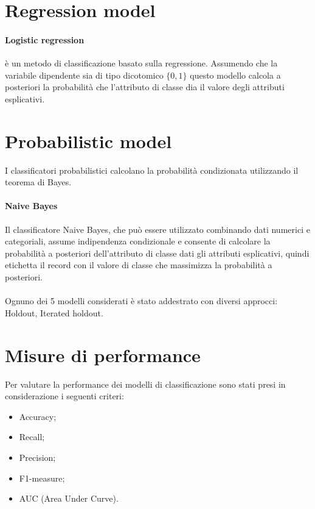\documentclass[12pt,a4paper]{report}
\begin{document}
\begin{multicols}{2}
	\section{Regression model} 
	
	\paragraph{Logistic regression} è un metodo di classificazione basato sulla regressione. Assumendo che la variabile dipendente sia di tipo dicotomico $\{0,1\}$ questo modello calcola a posteriori la probabilità  che l'attributo di classe dia il valore degli attributi esplicativi.
	
	\section{Probabilistic model} 
	
	I classificatori probabilistici calcolano la probabilità condizionata utilizzando il teorema di Bayes. 
	
	\paragraph{Naive Bayes} Il classificatore Naive Bayes, che può essere utilizzato combinando dati numerici e categoriali, assume indipendenza condizionale e consente di calcolare la probabilità a posteriori dell'attributo di classe dati gli attributi esplicativi, quindi etichetta il record con il valore di classe che massimizza la probabilità a posteriori.
	\\\\
	Ognuno dei 5 modelli considerati è stato addestrato con diversi approcci: Holdout, Iterated holdout.
	
	\section{Misure di performance}
	
	
	Per valutare la performance dei modelli di classificazione sono stati presi in considerazione i seguenti criteri:
	\begin{itemize}
		\item 	Accuracy;
		\item  Recall;
		\item  Precision;
		\item  F1-measure;
		\item  AUC (Area Under Curve).
	\end{itemize}


\end{multicols}
\end{document}
